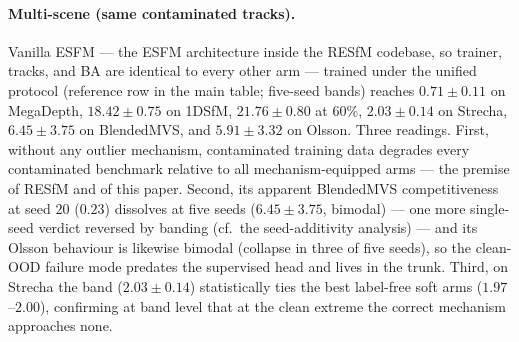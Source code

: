 \documentclass{article}
\begin{document}
\paragraph{Multi-scene (same contaminated tracks).} Vanilla ESFM --- the ESFM
architecture inside the RESfM codebase, so trainer, tracks, and BA are identical to
every other arm --- trained under the unified protocol (reference row in the main
table; five-seed bands) reaches
$0.71\pm0.11$ on MegaDepth, $18.42\pm0.75$ on 1DSfM, $21.76\pm0.80$ at $60\%$,
$2.03\pm0.14$ on Strecha, $6.45\pm3.75$ on BlendedMVS, and $5.91\pm3.32$ on Olsson.
Three readings. First, without any outlier mechanism, contaminated training data
degrades every contaminated benchmark relative to all mechanism-equipped arms --- the
premise of RESfM and of this paper. Second, its apparent BlendedMVS competitiveness at
seed $20$ ($0.23$) dissolves at five seeds ($6.45\pm3.75$, bimodal) --- one more
single-seed verdict reversed by banding (cf.\ the seed-additivity analysis) --- and
its Olsson behaviour is likewise bimodal (collapse in three of five seeds), so the
clean-OOD failure mode predates the supervised head and lives in the trunk. Third, on
Strecha the band ($2.03\pm0.14$) statistically ties the best label-free soft arms
($1.97$--$2.00$), confirming at band level that at the clean extreme the correct
mechanism approaches none.
\end{document}
